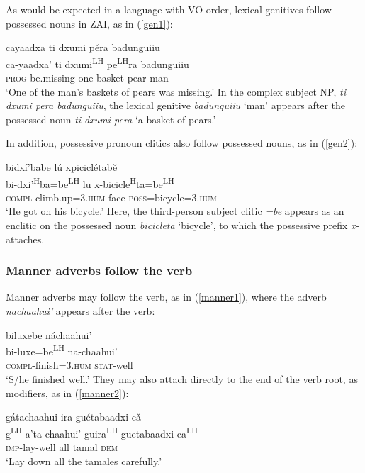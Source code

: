 As would be expected in a language with VO order, lexical genitives follow possessed nouns in ZAI, as in (\ref{gen1}): 

\ea\label{gen1}
\glll cayaadxa ti dxumi p\v{e}ra badunguiiu \\
ca-yaadxa' ti dxumi\textsuperscript{LH} pe\textsuperscript{LH}ra badunguiiu \\
\textsc{prog}-be.missing one basket pear man \\
\glt `One of the man's baskets of pears was missing.'
\z
In the complex subject NP, \textit{ti dxumi pera badunguiiu}, the lexical genitive \textit{badunguiiu} `man' appears after the possessed noun \textit{ti dxumi pera} `a basket of pears.'

In addition, possessive pronoun clitics also follow possessed nouns, as in (\ref{gen2}):

\ea\label{gen2}
\glll bidx\'{i}'babe l\'{u} xpiciclétab\v{e} \\
bi-dxi'\textsuperscript{H}ba=be\textsuperscript{LH} lu x-bicicle\textsuperscript{H}ta=be\textsuperscript{LH} \\
\textsc{compl}-climb.up=\textsc{3.hum} face \textsc{poss}=bicycle=\textsc{3.hum} \\
\glt `He got on his bicycle.'
\z
Here, the third-person subject clitic \textit{=be} appears as an enclitic on the possessed noun \textit{bicicleta} `bicycle', to which the possessive prefix \textit{x-} attaches.



\subsubsection{Manner adverbs follow the verb}

Manner adverbs may follow the verb, as in (\ref{manner1}), where the adverb \textit{nachaahui'} appears after the verb: 

\ea\label{manner1}
\glll biluxebe náchaahui' \\
bi-luxe=be\textsuperscript{LH} na-chaahui' \\
\textsc{compl}-finish=\textsc{3.hum} \textsc{stat}-well \\
\glt `S/he finished well.'
\z
They may also attach directly to the end of the verb root, as modifiers, as in (\ref{manner2}):

\ea\label{manner2}
\glll gátachaahui ira guétabaadxi c\v{a} \\
g\textsuperscript{LH}-a'ta-chaahui' guira\textsuperscript{LH} guetabaadxi ca\textsuperscript{LH} \\
\textsc{imp}-lay-well all tamal \textsc{dem} \\
\glt `Lay down all the tamales carefully.'
\z


